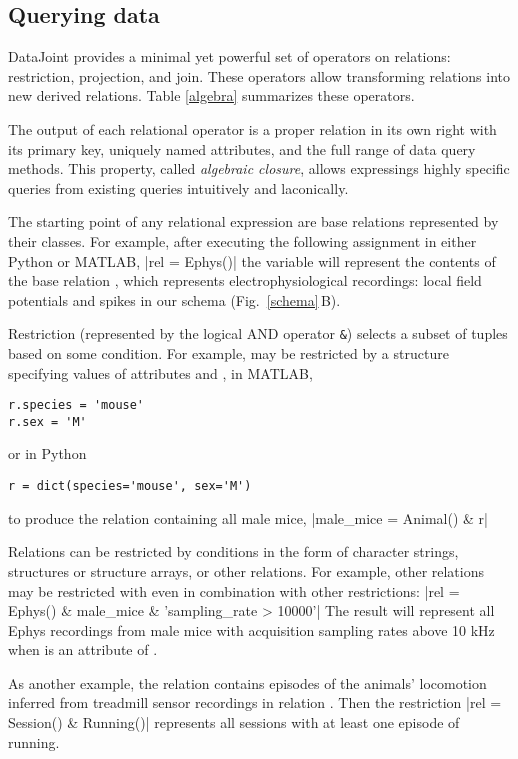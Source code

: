 \subsection*{Querying data}
DataJoint provides a minimal yet powerful set of operators on relations: restriction, projection, and join.
These operators allow transforming relations into new derived relations. 
Table \ref{algebra} summarizes these operators.



The output of each relational operator is a proper relation in its own right with its primary key, uniquely named attributes, and the full range of data query methods.
This property, called \emph{algebraic closure}, allows expressings highly specific queries from existing queries intuitively and laconically.

The starting point of any relational expression are base relations represented by their classes. 
For example, after executing the following assignment in either Python or MATLAB,
|rel = Ephys()|
the variable  will represent the contents of the base relation , which represents electrophysiological recordings: local field potentials and spikes in our schema  (Fig.\ \ref{schema}\,B).

Restriction (represented by the logical AND operator {\tt \&}) selects a subset of tuples based on some condition.
For example,  may be restricted by a structure specifying values of attributes  and ,
in MATLAB,
\begin{verbatim}
r.species = 'mouse'
r.sex = 'M'
\end{verbatim}
or in Python
\begin{verbatim}
r = dict(species='mouse', sex='M')
\end{verbatim}
to produce the relation containing all male mice,
|male_mice = Animal() & r|

Relations can be restricted by conditions in the form of character strings, structures or structure arrays, or other relations.
For example, other relations may be restricted with  even in combination with other restrictions:
|rel = Ephys() & male_mice & 'sampling_rate > 10000'|
The result  will represent all Ephys recordings from male mice with acquisition sampling rates above 10 kHz when  is an attribute of .


As another example, the relation  contains episodes of the animals' locomotion inferred from treadmill sensor recordings in relation .
Then the restriction
|rel = Session() & Running()|
represents all sessions with at least one episode of running.

